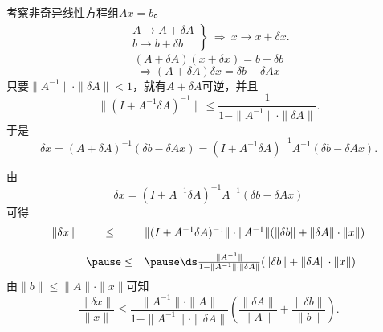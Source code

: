 \begin{frame}\ft{\secname}

考察非奇异线性方程组$Ax = b$。
$$
\begin{array}{l}
\left.
\begin{array}{l}
A \rightarrow A+\delta A\\[0.2cm]
b \rightarrow b+\delta b
\end{array}
\right\}
~\Longrightarrow~
x \rightarrow x + \delta x.
\end{array}
$$
\pause 
$$
(A+\delta A)(x + \delta x) = b + \delta b
$$
$$
\Longrightarrow (A+\delta A) \delta x  =  \delta b - \delta A x
$$
\pause 
\textcolor{acolor3}{
只要$\|A^{-1}\|\cdot\|\delta A\|<1$，就有$A+\delta A$可逆，并且
$$
\|(I + A^{-1}\delta A)^{-1}\|\le \frac1{1-\|A^{-1}\|\cdot \|\delta A\|}.
$$
}
\pause 
于是
$$
\delta x = (A+\delta A)^{-1} (\delta b - \delta A x)
= (I+A^{-1}\delta A)^{-1} A^{-1} (\delta b - \delta A x).
$$



\end{frame}

\begin{frame}\ft{\secname}

由
$$
\delta x 
= (I+A^{-1}\delta A)^{-1} A^{-1} (\delta b - \delta A x) 
$$
可得
$$
\begin{array}{rcl}
\|\delta x\| 
&\le&  
\| (I+A^{-1}\delta A)^{-1}\| \cdot \| A^{-1} \| (\|\delta b \| + \|\delta A\|\cdot \| x\|)\\[0.4cm]  
& \pause 
\le & \pause \ds \frac{\| A^{-1} \|}{1-\|A^{-1}\|\cdot \|\delta A\|}(\|\delta b \| + \|\delta A\|\cdot \| x\|)
\end{array}
$$
\pause 
由$ \|b\|\le \|A\|\cdot\|x\|$可知 \pause 
$$
\frac{\|\delta x\|}{\|x\|} \le \frac{\| A^{-1} \|\cdot \| A \|}{1-\|A^{-1}\|\cdot \|\delta A\|}
\left(\frac{\|\delta A \|}{\|A\|} + \frac{\|\delta b \|}{\|b\|}\right).
$$



\end{frame}

